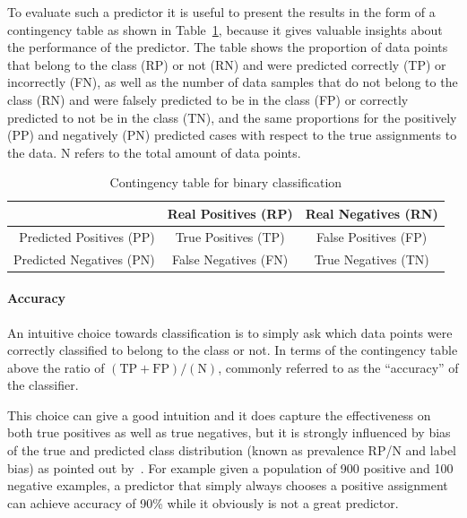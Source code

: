 To evaluate such a predictor it is useful to present the results in the form of a contingency table as shown in Table~\ref{table:contingency-table-2}, because it gives valuable insights about the performance of the predictor. The table shows the proportion of data points that belong to the class (RP) or not (RN) and were predicted correctly (TP) or incorrectly (FN), as well as the number of data samples that do not belong to the class (RN) and were falsely predicted to be in the class (FP) or correctly predicted to not be in the class (TN), and the same proportions for the positively (PP) and negatively (PN) predicted cases with respect to the true assignments to the data. N refers to the total amount of data points.

\begin{table}[h]
  \begin{center}
    \begin{tabular}{r | c c }
      & Real Positives (RP) & Real Negatives (RN) \\
      \hline
      Predicted Positives (PP) & True Positives (TP) & False Positives (FP) \\
      Predicted Negatives (PN) & False Negatives (FN) & True Negatives (TN) \\
    \end{tabular}
  \caption{Contingency table for binary classification}
\label{table:contingency-table-2}
  \end{center}
\end{table}

\paragraph{Accuracy}
\label{par:Accuracy}

An intuitive choice towards classification is to simply ask which data points were correctly classified to belong to the class or not. In terms of the contingency table above the ratio of $(\text{TP} + \text{FP}) / (\text{N})$, commonly referred to as the ``accuracy'' of the classifier.

This choice can give a good intuition and it does capture the effectiveness on both true positives as well as true negatives, but it is strongly influenced by bias of the true and predicted class distribution (known as prevalence RP/N and label bias) as pointed out by~\cite{Powers:2011aa}. For example given a population of 900 positive and 100 negative examples, a predictor that simply always chooses a positive assignment can achieve accuracy of 90\% while it obviously is not a great predictor.

